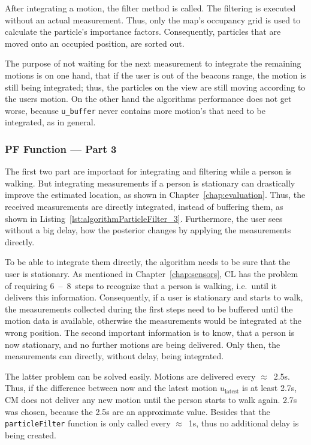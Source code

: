 After integrating a motion, the filter method is called. The filtering is executed without an actual measurement. Thus, only the map's occupancy grid is used to calculate the particle's importance factors. Consequently, particles that are moved onto an occupied position, are sorted out.

The purpose of not waiting for the next measurement to integrate the remaining motions is on one hand, that if the user is out of the beacons range, the motion is still being integrated; thus, the particles on the view are still moving according to the users motion. On the other hand the algorithms performance does not get worse, because \texttt{u\_buffer} never contains more motion's that need to be integrated, as in general.




\subsubsection*{\acl{PF} Function --- Part 3}
The first two part are important for integrating and filtering while a person is walking. But integrating measurements if a person is stationary can drastically improve the estimated location, as shown in Chapter~\ref{chap:evaluation}. Thus, the received measurements are directly integrated, instead of buffering them, as shown in Listing~\ref{lst:algorithmParticleFilter_3}. Furthermore, the user sees without a big delay, how the posterior changes by applying the measurements directly.

To be able to integrate them directly, the algorithm needs to be sure that the user is stationary. As mentioned in Chapter~\ref{chap:sensors}, \acs{CL} has the problem of requiring 6~--~8~steps to recognize that a person is walking, i.e.\ until it delivers this information. Consequently, if a user is stationary and starts to walk, the measurements collected during the first steps need to be buffered until the motion data is available, otherwise the measurements would be integrated at the wrong position. The second important information is to know, that a person is now stationary, and no further motions are being delivered. Only then, the measurements can directly, without delay, being integrated.

The latter problem can be solved easily. Motions are delivered every $\approx$~2.5s. Thus, if the difference between now and the latest motion $u_\text{latest}$ is at least 2.7s, \acs{CM} does not deliver any new motion until the person starts to walk again. 2.7s was chosen, because the 2.5s are an approximate value. Besides that the \texttt{particleFilter} function is only called every $\approx$~1s, thus no additional delay is being created.

